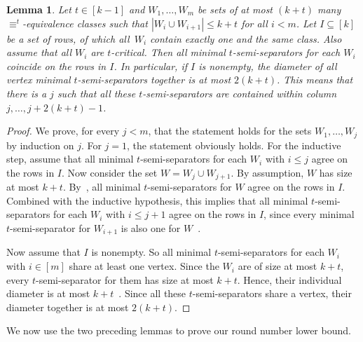 \documentclass[10pt,a4paper]{article}
\newcommand{\defining}[1]{\emph{#1}}
\newcommand{\comp}{\equiv}
\newtheorem{lemma}[theorem]{Lemma}
\begin{document}
\begin{lemma}
	\label{lem:separator-move-when-some-are-fixed}
	Let $t\in [k-1]$ and $W_1, \dots, W_m$ be sets of at most $(k+t)$ many $\comp^t$-equivalence classes
	such that $|W_i\cup W_{i+1}| \leq k+t$ for all $i < m$.
	Let $I\subseteq [k]$ be a set of rows,
	of which all~$W_i$ contain exactly one and the same class.
	Also assume that all $W_i$ are $t$-critical.    
	Then all minimal $t$-semi-separators for each $W_i$
	coincide on the rows in $I$.
	In particular,  if $I$ is nonempty, the \defining{diameter} of all vertex minimal $t$-semi-separators together
	is at most $2(k+t)$.
	This means that there is a $j$ such that
	all these $t$-semi-separators 
	are contained within column $j, \dots, j + 2(k+t)-1$.
\end{lemma}
\begin{proof}
	We prove, for every $j < m$, that the statement holds for the sets $W_1,\dots,W_j$ by induction on $j$.
	For $j = 1$, the statement obviously holds.
	For the inductive step,
	assume that all minimal $t$-semi-separators for each $W_i$ with $i \leq j$ agree on the rows in $I$.
	Now consider the set $W = W_j \cup W_{j+1}$.
	By assumption, $W$ has size at most $k+t$.
	By~\cite[Proposition 4.9]{RFJN024},
	all minimal $t$-semi-separators for $W$ agree on the rows in $I$. 
	Combined with the inductive hypothesis,
	this implies that all minimal $t$-semi-separators for each $W_i$ with $i \leq j+1$
	agree on the rows in $I$,
	since every minimal $t$-semi-separator for $W_{i+1}$
	is also one for $W$~\cite{RFJN024}.
	
	Now assume that $I$ is nonempty.
	So all minimal $t$-semi-separators for each $W_i$ with $i \in [m]$
	share at least one vertex. 
	Since the $W_i$ are of size at most $k+t$,
	every $t$-semi-separator for them has size at most $k+t$.
	Hence, their individual diameter is at most $k+t$~\cite{RFJN024}.
	Since all these $t$-semi-separators share a vertex,
	their diameter together is at most $2(k+t)$.
\end{proof}

\noindent We now use the two preceding lemmas to prove our round number lower bound.
\end{document}

